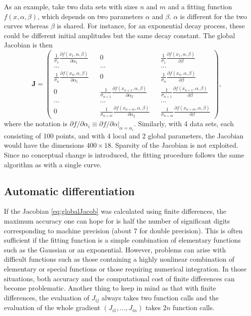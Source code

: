 \documentclass{article}
\begin{document}
As an example, take two data sets with sizes $n$ and $m$ and a fitting function $f(x,\alpha,\beta)$, which depends on two parameters $\alpha$ and $\beta$. $\alpha$ is different for the two curves whereas $\beta$ is shared. For instance, for an exponential decay process, these could be different initial amplitudes but the same decay constant. The global Jacobian is then
\begin{equation}
  \label{eq:globalJacob}
  \bm J =
  \left( \begin{matrix}
      \frac{1}{\sigma_1} \frac{\partial f(x_1, \alpha, \beta)}
      {\partial\alpha_1} && 0 && \frac{1}{\sigma_1} \frac{\partial
        f(x_1, \alpha, \beta)} {\partial\beta} \\
      \ldots && \ldots && \ldots \\
      \frac{1}{\sigma_n} \frac{\partial f(x_n, \alpha, \beta)}
      {\partial\alpha_1} && 0 && \frac{1}{\sigma_n} \frac{\partial
        f(x_n, \alpha, \beta)} {\partial\beta} \\
      0 && \frac{1}{\sigma_{n+1}} \frac{\partial f(x_{n+1}, \alpha,
        \beta)} {\partial\alpha_2} && \frac{1}{\sigma_{n+1}}
      \frac{\partial f(x_{n+1}, \alpha, \beta)} {\partial\beta} \\
      \ldots && \ldots && \ldots \\
      0 && \frac{1}{\sigma_{n+m}} \frac{\partial f(x_{n+m}, \alpha,
        \beta)} {\partial\alpha_2} && \frac{1}{\sigma_{n+m}}
      \frac{\partial f(x_{n+m}, \alpha, \beta)} {\partial\beta}
    \end{matrix} \right),
\end{equation}
where the notation is $\partial f / \partial\alpha_i \equiv \partial f / \partial\alpha |_{\alpha = \alpha_i}$. Similarly, with 4 data sets, each consisting of 100 points, and with 4 local and 2 global parameters, the Jacobian would have the dimensions $400\times18$. Sparsity of the Jacobian is not exploited. Since no conceptual change is introduced, the fitting procedure follows the same algorithm as with a single curve.

\subsection{\label{sec:ad}Automatic differentiation}

If the Jacobian \eqref{eq:globalJacob} was calculated using finite differences, the maximum accuracy one can hope for is half the number of significant digits corresponding to machine precision (about 7 for double precision). This is often sufficient if the fitting function is a simple combination of elementary functions such as the Gaussian or an exponential. However, problems can arise with difficult functions such as those containing a highly nonlinear combination of elementary or special functions or those requiring numerical integration. In those situations, both accuracy and the computational cost of finite differences can become problematic. Another thing to keep in mind as that with finite differences, the evaluation of $J_{ij}$ always takes two function calls and the evaluation of the whole gradient $(J_{i1}, \ldots, J_{in})$ takes $2n$ function calls.
\end{document}
